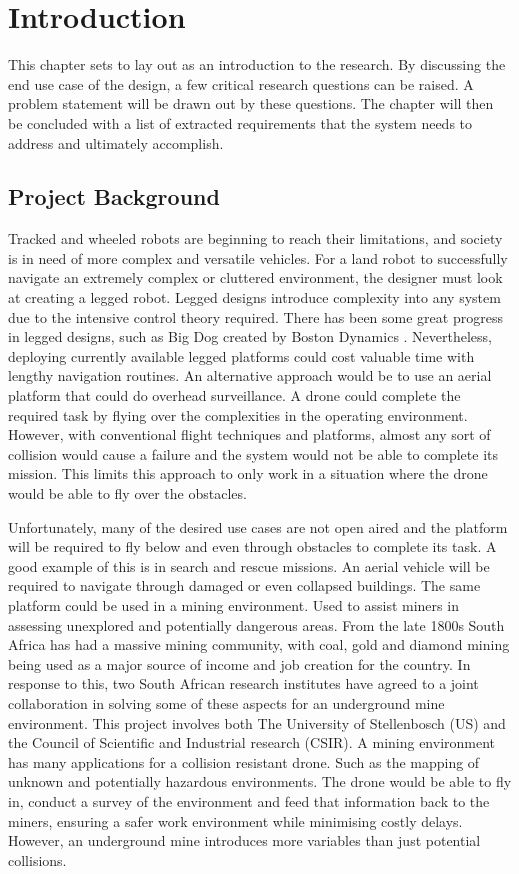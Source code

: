 \chapter{Introduction}
This chapter sets to lay out as an introduction to the research. By discussing the end use case of the design, a few critical research questions can be raised. A problem statement will be drawn out by these questions. The chapter will then be concluded with a list of extracted requirements that the system needs to address and ultimately accomplish. 

	\section{Project Background}
	Tracked and wheeled robots are beginning to reach their limitations, and society is in need of more complex and versatile vehicles. For a land robot to successfully navigate an extremely complex or cluttered environment, the designer must look at creating a legged robot. Legged designs introduce complexity into any system due to the intensive control theory required. There has been some great progress in legged designs, such as Big Dog created by Boston Dynamics \cite{BigDog}. Nevertheless, deploying currently available legged platforms could cost valuable time with lengthy navigation routines. An alternative approach would be to use an aerial platform that could do overhead surveillance. A drone could complete the required task by flying over the complexities in the operating environment. However, with conventional flight techniques and platforms, almost any sort of collision would cause a failure and the system would not be able to complete its mission. This limits this approach to only work in a situation where the drone would be able to fly over the obstacles. 
	
	Unfortunately, many of the desired use cases are not open aired and the platform will be required to fly below and even through obstacles to complete its task. A good example of this is in search and rescue missions. An aerial vehicle will be required to navigate through damaged or even collapsed buildings. The same platform could be used in a mining environment. Used to assist miners in assessing unexplored and potentially dangerous areas. 
	From the late 1800s South Africa has had a massive mining community, with coal, gold and diamond mining being used as a major source of income and job creation for the country. In response to this, two South African research institutes have agreed to a joint collaboration in solving some of these aspects for an underground mine environment. This project involves both The University of Stellenbosch (US) and the Council of Scientific and Industrial research (CSIR). A mining environment has many applications for a collision resistant drone. Such as the mapping of unknown and potentially hazardous environments. The drone would be able to fly in, conduct a survey of the environment and feed that information back to the miners, ensuring a safer work environment while minimising costly delays. However, an underground mine introduces more variables than just potential collisions.
	
